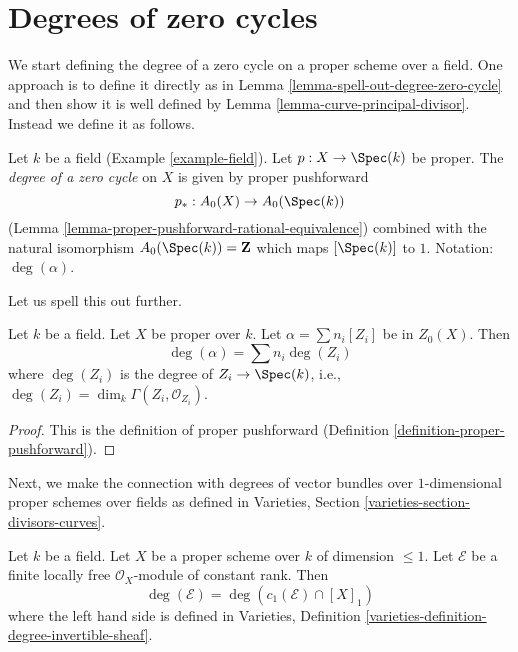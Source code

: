 \section{Degrees of zero cycles}
\label{section-degree-zero-cycles}

\noindent
We start defining the degree of a zero cycle on a proper scheme over a field.
One approach is to define it directly as in
Lemma \ref{lemma-spell-out-degree-zero-cycle} and then show
it is well defined by
Lemma \ref{lemma-curve-principal-divisor}.
Instead we define it as follows.

\begin{definition}
\label{definition-degree-zero-cycle}
Let $k$ be a field (Example \ref{example-field}). Let $p : X \to \Spec(k)$
be proper. The {\it degree of a zero cycle} on $X$ is given by proper
pushforward
$$
p_* : A_0(X) \to A_0(\Spec(k))
$$
(Lemma \ref{lemma-proper-pushforward-rational-equivalence})
combined with the natural isomorphism $A_0(\Spec(k)) = \mathbf{Z}$
which maps $[\Spec(k)]$ to $1$. Notation: $\deg(\alpha)$.
\end{definition}

\noindent
Let us spell this out further.

\begin{lemma}
\label{lemma-spell-out-degree-zero-cycle}
Let $k$ be a field. Let $X$ be proper over $k$. Let $\alpha = \sum n_i[Z_i]$
be in $Z_0(X)$. Then
$$
\deg(\alpha) = \sum n_i\deg(Z_i)
$$
where $\deg(Z_i)$ is the degree of $Z_i \to \Spec(k)$, i.e.,
$\deg(Z_i) = \dim_k \Gamma(Z_i, \mathcal{O}_{Z_i})$.
\end{lemma}

\begin{proof}
This is the definition of proper pushforward
(Definition \ref{definition-proper-pushforward}).
\end{proof}

\noindent
Next, we make the connection with degrees of vector bundles
over $1$-dimensional proper schemes over fields as defined in
Varieties, Section \ref{varieties-section-divisors-curves}.

\begin{lemma}
\label{lemma-degree-vector-bundle}
Let $k$ be a field. Let $X$ be a proper scheme over $k$ of dimension $\leq 1$.
Let $\mathcal{E}$ be a finite locally free $\mathcal{O}_X$-module of constant
rank. Then
$$
\deg(\mathcal{E}) = \deg(c_1(\mathcal{E}) \cap [X]_1)
$$
where the left hand side is defined in
Varieties, Definition \ref{varieties-definition-degree-invertible-sheaf}.
\end{lemma}

